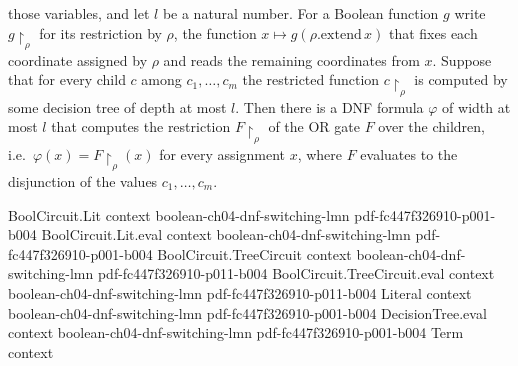 \begin{lemma}
those variables, and let $l$ be a natural number. For a Boolean function $g$ write
$g\!\restriction_\rho$ for its restriction by $\rho$, the function $x \mapsto
g(\rho.\mathrm{extend}\,x)$ that fixes each coordinate assigned by $\rho$ and reads the
remaining coordinates from $x$. Suppose that for every child $c$ among $c_1,\dots,c_m$
the restricted function $c\!\restriction_\rho$ is computed by some decision tree of
depth at most $l$. Then there is a DNF formula $\varphi$ of width at most $l$ that
computes the restriction $F\!\restriction_\rho$ of the OR gate $F$ over the children,
i.e.\ $\varphi(x) = F\!\restriction_\rho(x)$ for every assignment $x$, where $F$
evaluates to the disjunction of the values $c_1,\dots,c_m$.
\end{lemma}

\begin{lemma}
\label{LMN.compress_and_switch}
\leanok
{}
\proofstep
  {BoolCircuit.Lit}
  {context}
  {boolean-ch04-dnf-switching-lmn}
  {pdf-fc447f326910-p001-b004}
\proofstep
  {BoolCircuit.Lit.eval}
  {context}
  {boolean-ch04-dnf-switching-lmn}
  {pdf-fc447f326910-p001-b004}
\proofstep
  {BoolCircuit.TreeCircuit}
  {context}
  {boolean-ch04-dnf-switching-lmn}
  {pdf-fc447f326910-p011-b004}
\proofstep
  {BoolCircuit.TreeCircuit.eval}
  {context}
  {boolean-ch04-dnf-switching-lmn}
  {pdf-fc447f326910-p011-b004}
\proofstep
  {Literal}
  {context}
  {boolean-ch04-dnf-switching-lmn}
  {pdf-fc447f326910-p001-b004}
\proofstep
  {DecisionTree.eval}
  {context}
  {boolean-ch04-dnf-switching-lmn}
  {pdf-fc447f326910-p001-b004}
\proofstep
  {Term}
  {context}

\end{lemma}
